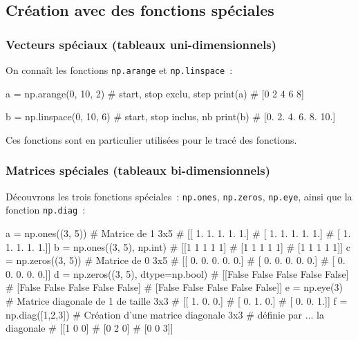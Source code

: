 \documentclass[10pt,fleqn]{article} %
\begin{document}
\subsection{Création avec des fonctions spéciales}

\subsubsection{Vecteurs spéciaux (tableaux uni-dimensionnels)}

On connaît les fonctions \texttt{np.arange} et \texttt{np.linspace}~: 

\begin{multicols}{2}
\begin{python}
a = np.arange(0, 10, 2) # start, stop exclu, step
print(a)
# [0 2 4 6 8]
\end{python}
\begin{python}
b = np.linspace(0, 10, 6) # start, stop inclus, nb
print(b)
# [0. 2. 4. 6. 8. 10.]  
\end{python}
\end{multicols}
Ces fonctions sont en particulier utilisées pour le tracé des
fonctions. %



\subsubsection{Matrices spéciales (tableaux bi-dimensionnels)}

Découvrons les trois fonctions spéciales~: \texttt{np.ones},
\texttt{np.zeros}, \texttt{np.eye}, ainsi que la fonction \texttt{np.diag}~:

\begin{multicols}{2}
\begin{python}
a = np.ones((3, 5)) # Matrice de 1 3x5
# [[ 1.  1.  1.  1.  1.]
#  [ 1.  1.  1.  1.  1.]
#  [ 1.  1.  1.  1.  1.]]
b = np.ones((3, 5), np.int)
# [[1 1 1 1 1]
#  [1 1 1 1 1]
#  [1 1 1 1 1]]
c = np.zeros((3, 5)) # Matrice de 0 3x5
# [[ 0.  0.  0.  0.  0.]
#  [ 0.  0.  0.  0.  0.]
#  [ 0.  0.  0.  0.  0.]]
d = np.zeros((3, 5), dtype=np.bool)
# [[False False False False False]
#  [False False False False False]
#  [False False False False False]]
e = np.eye(3) # Matrice diagonale de 1 de taille 3x3
# [[ 1.  0.  0.]
#  [ 0.  1.  0.]
#  [ 0.  0.  1.]]  
f = np.diag([1,2,3]) # Création d'une matrice diagonale 3x3
#  définie par ... la diagonale
# [[1 0 0]
#  [0 2 0]
#  [0 0 3]]
\end{python}
\end{multicols}
\end{document}
